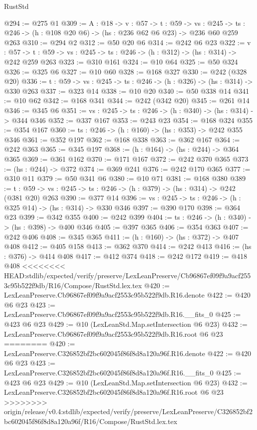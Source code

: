 \begin{lexlean}{RustStd}
\begin{coremodule}
{\begin{coremodule}
@294 := @275 @1
@309 := {A : @18} ->
  {v : @57} ->
  {t : @59} ->
  {vs : @245} -> {ts : @246} -> (h : @108 @20 @6) -> (hs : @236 @62 @6 @23) -> @236 @60 @259 @263
@310 := @294 @2
@312 := @50 @20 @6
@314 := @242 @6 @23
@322 := {v : @57} ->
  {t : @59} -> {vs : @245} -> {ts : @246} -> (h : @312) -> (hs : @314) -> @242 @259 @263
@323 := @310 @161
@324 := @10 @64
@325 := @50 @324
@326 := @325 @6
@327 := @10 @60
@328 := @168 @327
@330 := @242 (@328 @20)
@336 := {t : @59} -> {vs : @245} -> {ts : @246} -> (h : @326) -> (hs : @314) -> @330 @263
@337 := @323 @14
@338 := @10 @20
@340 := @50 @338 @14
@341 := @10 @62
@342 := @168 @341
@344 := @242 (@342 @20)
@345 := @261 @14
@346 := @345 @6
@351 := {vs : @245} -> {ts : @246} -> (h : @340) -> (hs : @314) -> @344 @346
@352 := @337 @167
@353 := @243 @23
@354 := @168 @324
@355 := @354 @167
@360 := {ts : @246} -> (h : @160) -> (hs : @353) -> @242 @355 @346
@361 := @352 @197
@362 := @168 @338
@363 := @362 @167
@364 := @242 @363
@365 := @345 @197
@368 := (h : @164) -> (hs : @244) -> @364 @365
@369 := @361 @162
@370 := @171 @167
@372 := @242 @370 @365
@373 := (hs : @244) -> @372
@374 := @369 @241
@376 := @242 @170 @365
@377 := @310 @11
@379 := @50 @341 @6
@380 := @10 @71
@381 := @168 @380
@389 := {t : @59} -> {vs : @245} -> {ts : @246} -> (h : @379) -> (hs : @314) -> @242 (@381 @20) @263
@390 := @377 @14
@396 := {vs : @245} -> {ts : @246} -> (h : @325 @14) -> (hs : @314) -> @330 @346
@397 := @390 @170
@398 := @364 @23
@399 := @342 @355
@400 := @242 @399
@404 := {ts : @246} -> (h : @340) -> (hs : @398) -> @400 @346
@405 := @397 @365
@406 := @354 @363
@407 := @242 @406
@408 := @345 @365
@411 := (h : @160) -> (hs : @372) -> @407 @408
@412 := @405 @158
@413 := @362 @370
@414 := @242 @413
@416 := (hs : @376) -> @414 @408
@417 := @412 @374
@418 := @242 @172
@419 := @418 @408
<<<<<<<< HEAD:stdlib/expected/verify/preserve/LexLeanPreserve/Cb96867ef09f9a9acf2553c95b522f9db/R16/Compose/RustStd.lex.tex
@420 := LexLeanPreserve.Cb96867ef09f9a9acf2553c95b522f9db.R16.denote
@422 := @420 @6 @23
@423 := LexLeanPreserve.Cb96867ef09f9a9acf2553c95b522f9db.R16.__fits_0
@425 := @423 @6 @23
@429 := @10 (LexLeanStd.Map.setIntersection @6 @23)
@432 := LexLeanPreserve.Cb96867ef09f9a9acf2553c95b522f9db.R16.root @6 @23
========
@420 := LexLeanPreserve.C326852bf2bc602045f86f8d8a120a96f.R16.denote
@422 := @420 @6 @23
@423 := LexLeanPreserve.C326852bf2bc602045f86f8d8a120a96f.R16.__fits_0
@425 := @423 @6 @23
@429 := @10 (LexLeanStd.Map.setIntersection @6 @23)
@432 := LexLeanPreserve.C326852bf2bc602045f86f8d8a120a96f.R16.root @6 @23
>>>>>>>> origin/release/v0.4:stdlib/expected/verify/preserve/LexLeanPreserve/C326852bf2bc602045f86f8d8a120a96f/R16/Compose/RustStd.lex.tex

\end{coremodule}}
\end{coremodule}
\end{lexlean}
